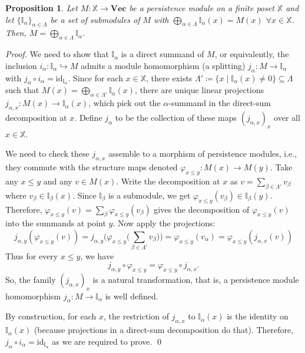 \documentclass[letterpaper,11pt]{article}
\theoremstyle{plain}
\newtheorem{proposition}[theorem]{Proposition}
\theoremstyle{definition}
\renewcommand{\phi}{\varphi}
\newcounter{li}
\newcommand{\VecSp}{\mathbf{Vec}}
\begin{document}
\begin{proposition}
    Let $M:\mathbb X\rightarrow \VecSp$ be a persistence module on a finite
    poset $\mathbb X$ and let $\{\mathbb{I}_\alpha\}_{\alpha\in \Lambda}$ be a set of submodules of $M$ with
    $\bigoplus_{\alpha\in\Lambda}\mathbb{I}_\alpha(x)=M(x)$  $\forall x\in \mathbb{X}$.
    Then, $M=\bigoplus_{\alpha\in\Lambda} {\mathbb I}_\alpha$.
    \label{prop:composition}
\end{proposition}
\begin{proof}
We need to show that $\mathbb{I}_\alpha$ is a direct summand of $M$, or equivalently, 
    the inclusion $i_\alpha\colon\mathbb{I}_\alpha\hookrightarrow M$ 
    admits a module homomorphism (a splitting) $j_\alpha: M\rightarrow \mathbb I_\alpha$ with $j_\alpha\circ i_\alpha=\mathrm{id}_{\mathbb I_\alpha}$. 
Since for each $x\in \mathbb{X}$, there exists $\Lambda'\coloneqq\{x\mid \mathbb{I}_\alpha(x)\neq 0\}\subseteq \Lambda$ 
    such that $M(x)=\bigoplus_{\alpha\in \Lambda'} \mathbb{I}_\alpha(x)$,
there are unique linear projections $j_{\alpha,x}\colon M(x)\rightarrow \mathbb{I_\alpha}(x)$,
which pick out the 
$\alpha$-summand in the direct-sum decomposition at $x$.
Define $j_\alpha$ to be the collection of these maps $(j_{\alpha,x})_{x}$ over all
$x\in \mathbb{X}$.

We need to check these $j_{\alpha,x}$ assemble to a morphism of persistence modules, i.e.,
they commute with the structure maps denoted $\phi_{x\leq y}\colon M(x)\rightarrow M(y)$.
Take any $x\leq y$ and any $v\in M(x)$. 
Write the decomposition at $x$ as
$v=\sum_{\beta\in \Lambda'} v_\beta$ where $v_\beta\in \mathbb{I}_\beta(x)$.
Since $\mathbb{I}_\beta$ is a submodule, we get $\phi_{x\leq y} (v_\beta)\in \mathbb I_\beta(y)$. Therefore, $\phi_{x\leq y}(v)=\sum_\beta \phi_{x\leq y}(v_\beta)$
gives the decomposition of $\phi_{x\leq y}(v)$ into the summands at point $y$.
Now apply the projections:
\[
j_{\alpha,y}(\phi_{x\leq y}(v))=j_{\alpha,y}\big(\phi_{x\leq y}\big(\sum_{\beta\in \Lambda'} v_\beta\big)\big)
= \phi_{x\leq y}(v_\alpha)=\phi_{x\leq y}(j_{\alpha,x}(v))
\]
Thus for every $x\leq y$, we have
\[
j_{\alpha,y}\circ \phi_{x\leq y}= \phi_{x\leq y}\circ j_{\alpha,x}.
\]
So, the family $(j_{\alpha,x})_{x}$ is a natural transformation, that is, a persistence module homomorphism $j_\alpha\colon M\rightarrow \mathbb I_\alpha$ is well defined.

By construction, for each $x$, the restriction of $j_{\alpha,x}$ to $\mathbb I_\alpha(x)$
is the identity on $\mathbb I_\alpha(x)$ (because projections in a direct-sum decomposition do that). Therefore, $j_\alpha\circ i_\alpha=\mathrm{id}_{\mathbb I_\alpha}$ as we are required to prove. \qed
\end{proof}
\end{document}
